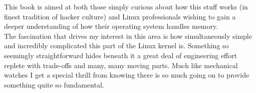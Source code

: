 This book is aimed at both those simply curious about how this stuff works (in
finest tradition of hacker culture) and Linux professionals wishing to gain a
deeper understanding of how their operating system handles memory.\\


The fascination that drives my interest in this area is how simultaneously
simple and incredibly complicated this part of the Linux kernel is. Something so
seemingly straightforward hides beneath it a great deal of engineering effort
replete with trade-offs and many, many moving parts. Much like mechanical
watches I get a special thrill from knowing there is so much going on to provide
something quite so fundamental.\\
